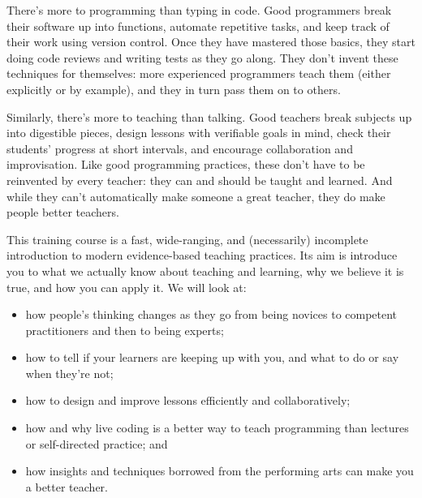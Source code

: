 
There's more to programming than typing in code.  Good programmers
break their software up into functions, automate repetitive tasks, and
keep track of their work using version control.  Once they have
mastered those basics, they start doing code reviews and writing tests
as they go along.  They don't invent these techniques for themselves:
more experienced programmers teach them (either explicitly or by
example), and they in turn pass them on to others.

Similarly, there's more to teaching than talking.  Good teachers break
subjects up into digestible pieces, design lessons with verifiable
goals in mind, check their students' progress at short intervals, and
encourage collaboration and improvisation.  Like good programming
practices, these don't have to be reinvented by every teacher: they
can and should be taught and learned.  And while they can't
automatically make someone a great teacher, they do make people better
teachers.


This training course is a fast, wide-ranging, and (necessarily)
incomplete introduction to modern evidence-based teaching practices.
Its aim is introduce you to what we actually know about teaching and
learning, why we believe it is true, and how you can apply it.  We
will look at:

\begin{itemize}

\item
  how people's thinking changes as they go from being novices to
  competent practitioners and then to being experts;

\item
  how to tell if your learners are keeping up with you, and what to
  do or say when they're not;

\item
  how to design and improve lessons efficiently and collaboratively;

\item
  how and why live coding is a better way to teach programming than
  lectures or self-directed practice; and

\item
  how insights and techniques borrowed from the performing arts can
  make you a better teacher.

\end{itemize}


